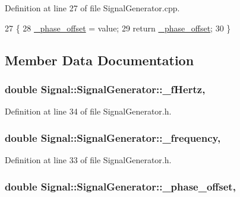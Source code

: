 Definition at line 27 of file Signal\+Generator.\+cpp.


\begin{DoxyCode}
27                                                                    \{
28     \hyperlink{class_signal_1_1_signal_generator_a6b4444d46747c8517171edbbf4b5588f}{\_phase\_offset} = value;
29     \textcolor{keywordflow}{return} \hyperlink{class_signal_1_1_signal_generator_a6b4444d46747c8517171edbbf4b5588f}{\_phase\_offset};
30 \}
\end{DoxyCode}


\subsection{Member Data Documentation}
\hypertarget{class_signal_1_1_signal_generator_a85a4702347352bab1c71e0a8df8437d6}{
\subsubsection[{\+\_\+f\+Hertz}]{\setlength{\rightskip}{0pt plus 5cm}double Signal\+::\+Signal\+Generator\+::\+\_\+f\+Hertz\hspace{0.3cm}{\ttfamily [protected]}, {\ttfamily [inherited]}}}\label{class_signal_1_1_signal_generator_a85a4702347352bab1c71e0a8df8437d6}


Definition at line 34 of file Signal\+Generator.\+h.

\hypertarget{class_signal_1_1_signal_generator_a7f107461333bce68c5dad412db96a8c2}{
\subsubsection[{\+\_\+frequency}]{\setlength{\rightskip}{0pt plus 5cm}double Signal\+::\+Signal\+Generator\+::\+\_\+frequency\hspace{0.3cm}{\ttfamily [protected]}, {\ttfamily [inherited]}}}\label{class_signal_1_1_signal_generator_a7f107461333bce68c5dad412db96a8c2}


Definition at line 33 of file Signal\+Generator.\+h.

\hypertarget{class_signal_1_1_signal_generator_a6b4444d46747c8517171edbbf4b5588f}{
\subsubsection[{\+\_\+phase\+\_\+offset}]{\setlength{\rightskip}{0pt plus 5cm}double Signal\+::\+Signal\+Generator\+::\+\_\+phase\+\_\+offset\hspace{0.3cm}{\ttfamily [protected]}, {\ttfamily [inherited]}}}\label{class_signal_1_1_signal_generator_a6b4444d46747c8517171edbbf4b5588f}


